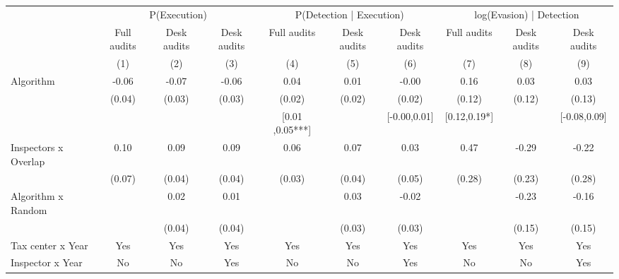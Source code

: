 \begin{tabular}{lccc|ccc|ccc} \toprule
\multicolumn{1}{l}{} & \multicolumn{3}{c}{P(Execution)} & \multicolumn{3}{c}{P(Detection | Execution)} & \multicolumn{3}{c}{log(Evasion) | Detection} \\\cmidrule(lr){2-4}\cmidrule(lr){5-7}\cmidrule(lr){8-10} \multicolumn{1}{l}{} & Full audits & Desk audits & Desk audits & Full audits & Desk audits & Desk audits & Full audits & Desk audits & Desk audits \\ \multicolumn{1}{l}{} & (1) & (2) & (3) & (4) & (5) & (6) & (7) & (8) & (9) \\ \midrule
Algorithm   &       -0.06\sym{*}  &       -0.07\sym{***}&       -0.06\sym{**} &        0.04\sym{**} &        0.01         &       -0.00         &        0.16         &        0.03         &        0.03         \\
            &      (0.04)         &      (0.03)         &      (0.03)         &      (0.02)         &      (0.02)         &      (0.02)         &      (0.12)         &      (0.12)         &      (0.13)         \\
\addlinespace
 & & & & [0.01 ,0.05***] & & [-0.00,0.01] & [0.12,0.19*] & & [-0.08,0.09] \\  Inspectors x Overlap&        0.10         &        0.09\sym{**} &        0.09\sym{**} &        0.06\sym{*}  &        0.07\sym{*}  &        0.03         &        0.47\sym{*}  &       -0.29         &       -0.22         \\
            &      (0.07)         &      (0.04)         &      (0.04)         &      (0.03)         &      (0.04)         &      (0.05)         &      (0.28)         &      (0.23)         &      (0.28)         \\
\addlinespace
Algorithm x Random&                     &        0.02         &        0.01         &                     &        0.03         &       -0.02         &                     &       -0.23         &       -0.16         \\
            &                     &      (0.04)         &      (0.04)         &                     &      (0.03)         &      (0.03)         &                     &      (0.15)         &      (0.15)         \\
\midrule
Tax center x Year&         Yes         &         Yes         &         Yes         &         Yes         &         Yes         &         Yes         &         Yes         &         Yes         &         Yes         \\
Inspector x Year&          No         &          No         &         Yes         &          No         &          No         &         Yes         &          No         &          No         &         Yes         \\

\end{tabular}
